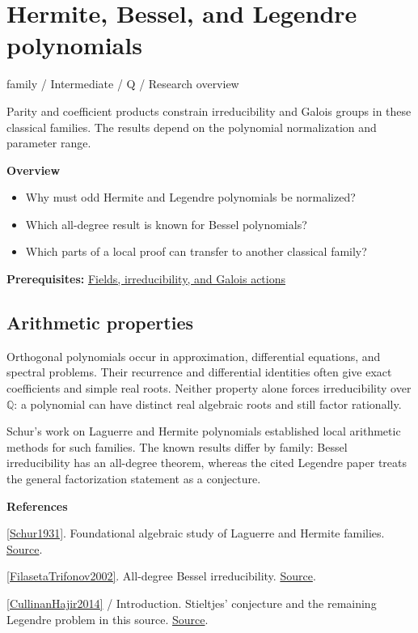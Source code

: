 \documentclass[11pt,a4paper,oneside,openany]{book}
\newenvironment{sources}{\par\smallskip\begingroup\footnotesize\color{atlasgray}\leftskip=10pt\setlength{\parskip}{2pt}}{\par\endgroup\smallskip}
\begin{document}
\chapter{Hermite, Bessel, and Legendre polynomials}\label{article:orthogonal-families}\hypertarget{article:orthogonal-families}{}\color{black}
{\sffamily\small\color{atlasgold}family / Intermediate / Q / Research overview}\par\medskip
Parity and coefficient products constrain irreducibility and Galois groups in these classical families. The results depend on the polynomial normalization and parameter range.\par\medskip
\textbf{Overview}\begin{itemize}
\item Why must odd Hermite and Legendre polynomials be normalized?
\item Which all-degree result is known for Bessel polynomials?
\item Which parts of a local proof can transfer to another classical family?
\end{itemize}
{\small\textbf{Prerequisites:} \hyperlink{article:foundations}{Fields, irreducibility, and Galois actions}}\par
{}\section{Arithmetic properties}
\color{black} Orthogonal polynomials occur in approximation, differential equations, and spectral problems. Their recurrence and differential identities often give exact coefficients and simple real roots. Neither property alone forces irreducibility over \(\mathbb Q\): a polynomial can have distinct real algebraic roots and still factor rationally.\par
\color{black} Schur's work on Laguerre and Hermite polynomials established local arithmetic methods for such families. The known results differ by family: Bessel irreducibility has an all-degree theorem, whereas the cited Legendre paper treats the general factorization statement as a conjecture.\par
\begin{sources}
\textbf{References}\par\smallskip
\noindent\hyperlink{ref:Schur1931}{[Schur1931]}. Foundational algebraic study of Laguerre and Hermite families. \href{https://doi.org/10.1515/crll.1931.165.52}{Source}.\par
\noindent\hyperlink{ref:FilasetaTrifonov2002}{[FilasetaTrifonov2002]}. All-degree Bessel irreducibility. \href{https://doi.org/10.1515/crll.2002.069}{Source}.\par
\noindent\hyperlink{ref:CullinanHajir2014}{[CullinanHajir2014]} / Introduction. Stieltjes' conjecture and the remaining Legendre problem in this source. \href{https://doi.org/10.1016/j.indag.2014.01.004}{Source}.\par
\end{sources}\color{black}
\end{document}
